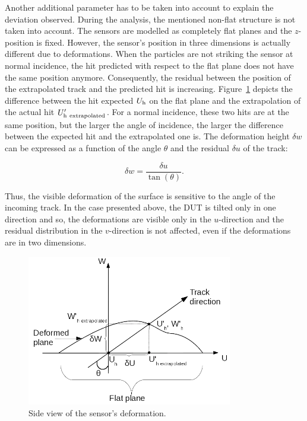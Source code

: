       Another additional parameter has to be taken into account to explain the deviation observed.
      During the analysis, the mentioned non-flat structure is not taken into account.
      The sensors are modelled as completely flat planes and the $z$-position is fixed.
      However, the sensor's position in three dimensions is actually different due to deformations.
      When the particles are not striking the sensor at normal incidence, the hit predicted with respect to the flat plane does not have the same position anymore.
      Consequently, the residual between the position of the extrapolated track and the predicted hit is increasing.
      Figure~\ref{fig:originDef} depicts the difference between the hit expected $U_{\rm{h}}$ on the flat plane and the extrapolation of the actual hit $U'_{\rm{h~extrapolated}}$.
      For a normal incidence, these two hits are at the same position, but the larger the angle of incidence, the larger the difference between the expected hit and the extrapolated one is.
      The deformation height $\delta w$ can be expressed as a function of the angle $\theta$ and the residual $\delta u$ of the track:

      \begin{equation}
        \delta w = \frac{\delta u}{\tan(\theta)}.
        \label{eq:deltaW}
      \end{equation}

      Thus, the visible deformation of the surface is sensitive to the angle of the incoming track.
      In the case presented above, the \gls{DUT} is tilted only in one direction and so, the deformations are visible only in the $u$-direction and the residual distribution in the $v$-direction is not affected, even if the deformations are in two dimensions.

      \begin{figure}[!tbh]
      \centering
        \includegraphics[width = 0.8\textwidth]{Pictures/deformation/origin_deformation.png}
        \caption{Side view of the sensor's deformation.}
        \label{fig:originDef}
      \end{figure}

